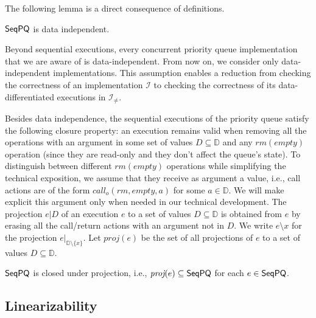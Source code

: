 The following lemma is a direct consequence of definitions.

\begin{lemma}
$\mathsf{SeqPQ}$ is data independent.
\end{lemma}

Beyond sequential executions, every concurrent priority queue implementation that we are aware of is data-independent. From now on, we consider only data-independent implementations. This assumption enables a reduction from checking the correctness of an implementation $\mathcal{I}$ to checking the correctness of its data-differentiated executions in $\mathcal{I}_{\neq}$.

Besides data independence, the sequential executions of the priority queue satisfy the following closure property: an execution remains valid when removing all the operations with an argument in some set of values $D \subseteq \mathbb{D}$ and any $\textit{rm}(\textit{empty})$ operation (since they are read-only and they don't affect the queue's state).
To distinguish between different $\textit{rm}(\textit{empty})$ operations while simplifying the technical exposition, we assume that they receive as argument a value, i.e., call actions are of the form $\textit{call}_o(\textit{rm},\textit{empty},a)$ for some $a\in \mathbb{D}$. We will make explicit this argument only when needed in our technical development. The projection $e \vert D$ of an execution $e$ to a set of values $D \subseteq \mathbb{D}$ is obtained from $e$ by erasing all the call/return actions with an argument not in $D$. We write $e \setminus x$ for the projection $e \vert_{ \mathbb{D} \setminus \{ x \} }$. Let $\textit{proj}(e)$ be the set of all projections of $e$ to a set of values $D \subseteq \mathbb{D}$. 


\begin{lemma}
\label{lem:closure_proj}
$\mathsf{SeqPQ}$ is closed under projection, i.e., $\textit{proj}(e)\subseteq \mathsf{SeqPQ}$ for each $e\in \mathsf{SeqPQ}$.
\end{lemma}


\subsection{Linearizability}\label{ssec:lin}

